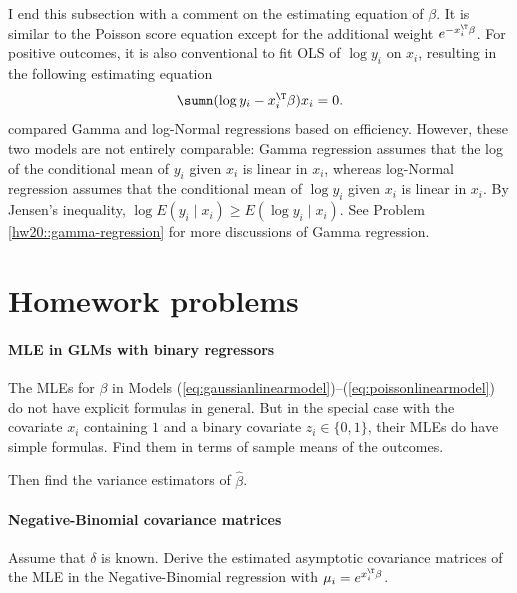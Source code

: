 I end this subsection with a comment on the estimating equation of $\beta$. It is similar to the Poisson score equation except for the additional weight $e^{ - x_i^{\T} \beta} $. For positive outcomes, it is also conventional to fit OLS of $\log y_i$ on $x_i$, resulting in the following estimating equation
$$
\sumn    (\log y_i - x_i^{\T} \beta) x_i   = 0.
$$
\citet{firth1988multiplicative} compared  Gamma and log-Normal regressions based on efficiency. However, these two models are not entirely comparable: Gamma regression assumes that the log of the conditional mean of $y_i$ given $x_i$ is linear in $x_i$, whereas log-Normal regression assumes that the conditional mean of $\log y_i$ given $x_i$ is linear in $x_i$. By Jensen's inequality, $\log E(y_i\mid x_i)   \geq  E( \log y_i\mid x_i)  .$
See Problem \ref{hw20::gamma-regression} for more discussions of Gamma regression. 



 




\section{Homework problems}

 

\paragraph{MLE in GLMs with binary regressors}\label{hw20::mle-binary-z}

The MLEs for $\beta$ in Models (\ref{eq:gaussianlinearmodel})--(\ref{eq:poissonlinearmodel})
do not have explicit formulas in general. But in the special case
with the covariate $x_{i}$ containing $1$ and a binary covariate $z_i \in \{0, 1\}$, their
MLEs do have simple formulas. Find them in terms of sample means of the outcomes.


Then find the variance estimators of $\hat\beta$. 



 
\paragraph{Negative-Binomial covariance matrices}\label{hw20::nb-sandwich}

Assume that $\delta$ is known. 
Derive the estimated asymptotic covariance matrices of the MLE in the Negative-Binomial regression with $\mu_i = e^{x_i^{\T} \beta}$.



